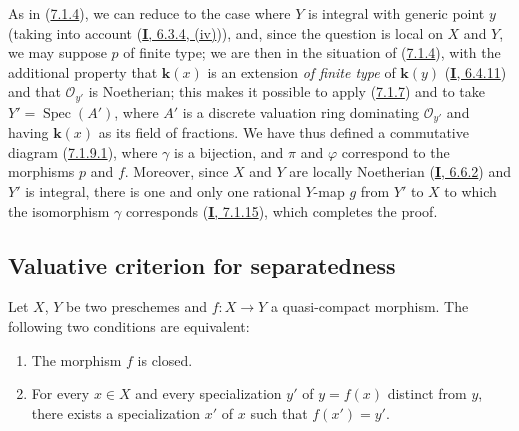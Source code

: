 As in (\hyperref[II.7.1.4]{7.1.4}), we can reduce to the case where $Y$
is integral with generic point $y$ (taking into account
(\hyperref[I.6.3.4]{\textbf{I}, 6.3.4, (iv)})), and, since the question is local on
$X$ and $Y$, we may suppose $p$ of finite type; we are then in the situation
of (\hyperref[II.7.1.4]{7.1.4}), with the additional property that
$\boldsymbol{k}(x)$ is an extension \emph{of finite type} of $\boldsymbol{k}(y)$
(\hyperref[I.6.4.11]{\textbf{I}, 6.4.11}) and that $\mathcal{O}_{y'}$ is Noetherian;
this makes it possible to apply (\hyperref[II.7.1.7]{7.1.7}) and to take
$Y'=\operatorname{Spec}(A')$, where $A'$ is a discrete valuation ring
dominating $\mathcal{O}_{y'}$ and having $\boldsymbol{k}(x)$ as its field of fractions. We
have thus defined a commutative diagram
(\hyperref[II.7.1.9.1]{7.1.9.1}), where $\gamma$ is a bijection, and $\pi$
and $\varphi$ correspond to the morphisms $p$ and $f$. Moreover, since $X$ and
$Y$ are locally Noetherian (\hyperref[I.6.6.2]{\textbf{I}, 6.6.2}) and $Y'$
is integral, there is one and only one rational $Y$-map $g$ from $Y'$
to $X$ to which the isomorphism $\gamma$ corresponds
(\hyperref[I.7.1.15]{\textbf{I}, 7.1.15}), which completes the proof.

\subsection{Valuative criterion for separatedness}
\label{subsection:II.7.2}

\begin{proposition}[7.2.1]
\label{II.7.2.1}
Let $X$, $Y$ be two preschemes and $f:X\to Y$ a quasi-compact morphism. The
following two conditions are equivalent:
\begin{enumerate}
\item[\rm a)] The morphism $f$ is closed.
\item[\rm b)] For every $x\in X$ and every specialization $y'$ of $y=f(x)$
distinct from $y$, there exists a specialization $x'$ of $x$ such that
$f(x')=y'$.
\end{enumerate}
\end{proposition}

